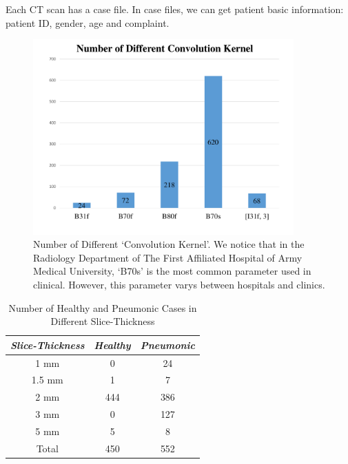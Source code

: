 Each CT scan has a case file. In case files, we can get patient basic information: patient ID, gender, age and complaint. 

\begin{figure}[t]
\centerline{\includegraphics[width=100mm]{NumberofDifferentConvolutionKernel.pdf}}
\vspace{-0cm}
\caption{Number of Different `Convolution Kernel'. We notice that in the Radiology Department of The First Affiliated Hospital of Army Medical University, `B70s' is the most common parameter used in clinical. However, this parameter varys between hospitals and clinics.}
\vspace{-0cm}
\label{NumberofDifferentConvolutionKernel}
\end{figure}


\begin{table}[htb]
\vspace{-0cm}
\caption{Number of Healthy and Pneumonic Cases in Different Slice-Thickness}
\vspace{-0cm}
\begin{center}
\begin{tabular}{|c|c|c|}
\hline
\textbf{\textit{Slice-Thickness}}& \textbf{\textit{Healthy}}& \textbf{\textit{Pneumonic}}  \\
\hline
1 mm & 0 & 24 \\
1.5 mm  & 1 & 7\\
2 mm & 444 & 386  \\
3 mm & 0 & 127  \\
5 mm & 5 & 8  \\
\hline
Total & 450 & 552 \\
\hline
\end{tabular}
\vspace{-0cm}
\label{distributionofhealthyandpneumonic}
\end{center}
\vspace{-0cm}
\end{table}

